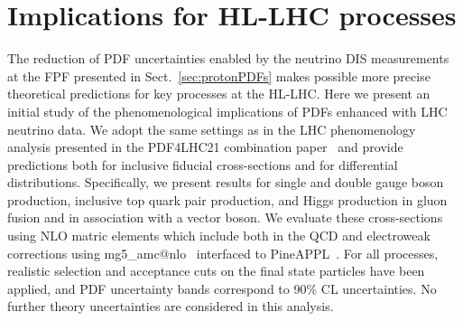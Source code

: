 \clearpage
\section{Implications for HL-LHC processes}
\label{sec:pheno}

The reduction of PDF uncertainties enabled by the neutrino DIS measurements
at the FPF presented in Sect.~\ref{sec:protonPDFs}
makes possible more precise theoretical predictions for key processes at the
HL-LHC.
%
Here we present an initial study of the phenomenological implications
of PDFs enhanced with LHC neutrino data.
%
We adopt the same settings as in the LHC phenomenology analysis presented
in the PDF4LHC21 combination paper~\cite{PDF4LHCWorkingGroup:2022cjn} and provide predictions
both for inclusive fiducial cross-sections and for differential distributions.
%
Specifically, we present results for 
single and double gauge boson production, inclusive top quark pair production,
and Higgs production in gluon
fusion and in association with a vector boson.
%
We evaluate these cross-sections using NLO matric elements
which include  both in the
QCD and electroweak corrections using
{\sc\small mg5\_amc@nlo}~\cite{Frederix:2018nkq}
interfaced to {\sc\small PineAPPL}~\cite{Carrazza:2020gss}.
%
For all processes, realistic selection and acceptance cuts on the final state particles
have been applied, and PDF uncertainty bands correspond to 90\% CL
uncertainties.
%
No further theory uncertainties are considered in this
analysis.
